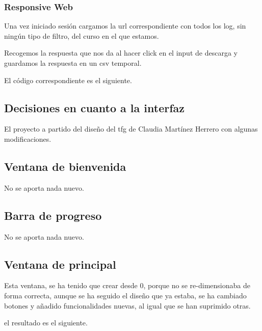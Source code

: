 
\subsubsection{Responsive Web}\label{responsive-web}

Una vez iniciado sesión cargamos la url correspondiente con todos los log, sin ningún tipo de filtro, del curso en el que estamos.

Recogemos la respuesta que nos da al hacer click en el input de descarga y guardamos la respuesta en un csv temporal.

El código correspondiente es el siguiente.



\subsection{Decisiones en cuanto a la interfaz}\label{decisiones-en-cuanto-a-la-interfaz}

El proyecto a partido del diseño del tfg de Claudia Martínez Herrero \cite{claudia} con algunas modificaciones.

\subsection{Ventana de bienvenida}\label{ventana-de-bienvenida}

No se aporta nada nuevo.

\subsection{Barra de progreso}\label{barra-de-progreso}

No se aporta nada nuevo.

\subsection{Ventana de principal}\label{ventana-de-principal}

Esta ventana, se ha tenido que crear desde 0, porque no se re-dimensionaba de forma correcta, aunque se ha seguido el diseño que ya estaba, se ha cambiado botones y añadido funcionalidades nuevas, al igual que se han suprimido otras. 

el resultado es el siguiente.


